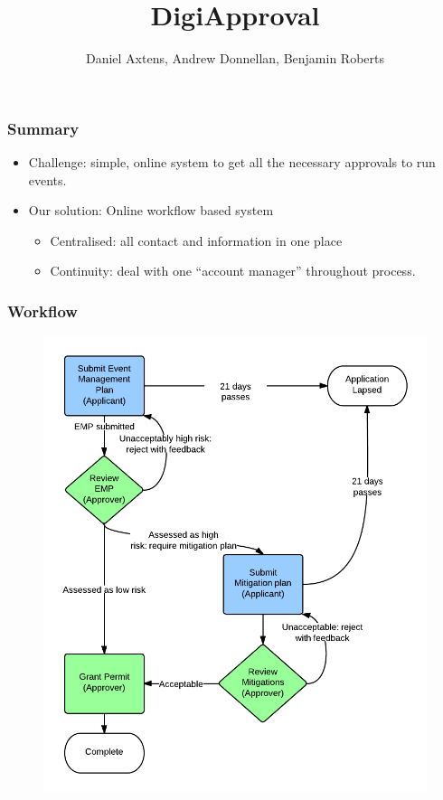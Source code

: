 \documentclass{beamer}
\title{\textbf{Digi}Approval}
\author{Daniel Axtens, Andrew Donnellan, Benjamin Roberts}
\begin{document}
\maketitle

\begin{frame}
  \frametitle{Summary}
  \begin{itemize}
  \item Challenge: simple, online system to get all the necessary approvals to run events.
  \item Our solution: Online workflow based system
    \begin{itemize}
    \item Centralised: all contact and information in one place
    \item Continuity: deal with one ``account manager'' throughout process.
    \end{itemize}
  \end{itemize}
\end{frame}


\begin{frame}
\frametitle{Workflow}
\begin{figure}[h!]
  \centering
  \includegraphics[scale=0.25]{./imgs/sample-workflow.png}  
\end{figure}
\end{frame}
\end{document}
